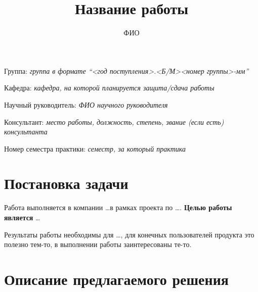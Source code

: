 \documentclass[a4paper]{article}
\title{Название работы}
\author{ФИО}
\date{}
\begin{document}
\maketitle

\begin{flushright}
    Группа: \emph{группа в формате \enquote{<год поступления>.<Б/М><номер группы>-мм}}

    Кафедра: \emph{кафедра, на которой планируется защита/сдача работы}

    Научный руководитель: \emph{ФИО научного руководителя}

    Консультант: \emph{место работы, должность, степень, звание (если есть) консультанта}
    
    Номер семестра практики: \emph{семестр, за который практика}
\end{flushright} 


\section{Постановка задачи}

Работа выполняется в компании \dots в рамках проекта по \dots. \textbf{Целью работы является} \dots

Результаты работы необходимы для \dots, для конечных пользователей продукта это полезно тем-то, в выполнении работы заинтересованы те-то.

\section{Описание предлагаемого решения}
\end{document}
